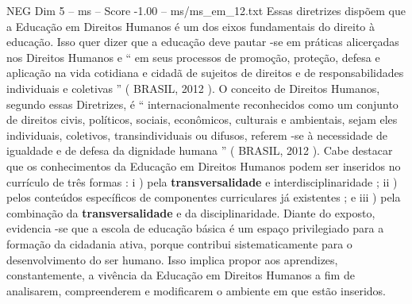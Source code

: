 \begin{textsample}{NEG Dim 5 – ms – Score -1.00 – ms/ms\_em\_12.txt}
Essas diretrizes dispõem que a Educação em Direitos Humanos é um dos eixos fundamentais do direito à educação.
Isso quer dizer que a educação deve pautar -se em práticas alicerçadas nos Direitos Humanos e “ em seus processos de promoção, proteção, defesa e aplicação na vida cotidiana e cidadã de sujeitos de direitos e de responsabilidades individuais e coletivas ” ( BRASIL, 2012 ).
O conceito de Direitos Humanos, segundo essas Diretrizes, é “ internacionalmente reconhecidos como um conjunto de direitos civis, políticos, sociais, econômicos, culturais e ambientais, sejam eles individuais, coletivos, transindividuais ou difusos, referem -se à necessidade de igualdade e de defesa da dignidade humana ” ( BRASIL, 2012 ).
Cabe destacar que os conhecimentos da Educação em Direitos Humanos podem ser inseridos no currículo de três formas : i ) pela \textbf{transversalidade} e interdisciplinaridade ; ii ) pelos conteúdos específicos de componentes curriculares já existentes ; e iii ) pela combinação da \textbf{transversalidade} e da disciplinaridade.
Diante do exposto, evidencia -se que a escola de educação básica é um espaço privilegiado para a formação da cidadania ativa, porque contribui sistematicamente para o desenvolvimento do ser humano.
Isso implica propor aos aprendizes, constantemente, a vivência da Educação em Direitos Humanos a fim de analisarem, compreenderem e modificarem o ambiente em que estão inseridos.

\end{textsample}

